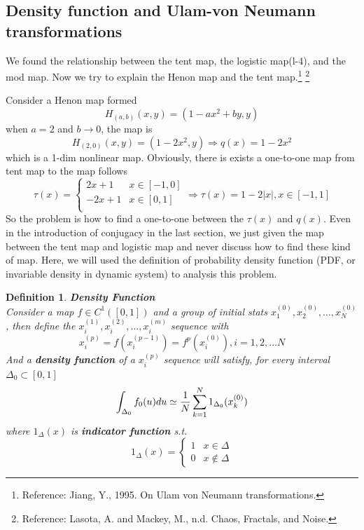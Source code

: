 \documentclass[12pt]{article}
\theoremstyle{plain}
\newtheorem{definition}{\textbf{Definition}}[section]
\begin{document}
\subsection{Density function and Ulam-von Neumann transformations}

We found the relationship between the tent map, the logistic map(l-4), and the mod map. Now we try to explain the Henon map and the tent map.\footnote{Reference: Jiang, Y., 1995. On Ulam von Neumann transformations.} \footnote{Reference: Lasota, A. and Mackey, M., n.d. Chaos, Fractals, and Noise.}

Consider a Henon map formed 
$$
H_{(a,b)}(x, y) = (1 - ax^2 + by, y)
$$
when $a = 2$ and $b \rightarrow 0$, the map is 
$$
H_{(2, 0)}(x, y) = (1 - 2x^2, y) \Rightarrow q(x) = 1 - 2x^2
$$
which is a 1-dim nonlinear map. Obviously, there is exists a one-to-one map from tent map to the map follows 
$$
\tau(x) = \left\{\begin{array}{ll}
2x + 1  & x \in [-1, 0] \\
-2x + 1 & x \in [0, 1] \\
\end{array}\right. \Rightarrow \tau(x) = 1 - 2|x|, x \in [-1, 1]
$$
So the problem is how to find a one-to-one between the $\tau(x)$ and $q(x)$. Even in the introduction of conjugacy in the last section, we just given the map between the tent map and logistic map and never discuss how to find these kind of map. Here, we will used the definition of probability density function (PDF, or invariable density in dynamic system) to analysis this problem.




\begin{definition}\textbf{Density Function}
\\\noindent Consider a map $f \in C^1([0, 1])$ and a group of initial stats $x_1^{(0)}, x_2^{(0)}, \ldots, x_N^{(0)}$, then define the $x_i^{(1)}, x_i^{(2)}, \ldots, x_i^{(m)}$ sequence with 
$$
x_i^{(p)} = f(x_i^{(p-1)}) = f^p(x_i^{(0)}), i = 1, 2, \ldots N
$$
And a \textbf{density function} of a $x_i^{(p)}$ sequence will satisfy, for every interval $\Delta_0 \subset [0, 1]$
$$
\int_{\Delta_0}f_0(u) du \simeq{1\over N} \sum_{k = 1}^{N}1_{\Delta_0}(x_k^{(0)})
$$
where $1_{\Delta}(x)$ is \textbf{indicator function} s.t. 
$$
1_{\Delta}(x) =\left\{\begin{array}{ll}
1 & x \in \Delta \\
0 & x \notin \Delta
\end{array}
\right.
$$
\end{definition}
\end{document}
